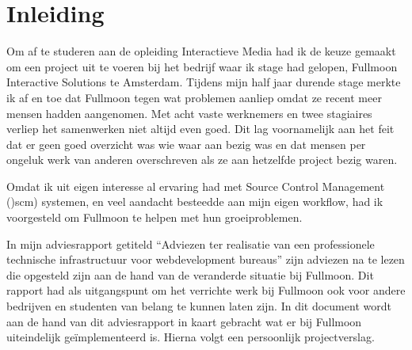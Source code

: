 \chapter{Inleiding}

Om af te studeren aan de opleiding Interactieve Media had ik de keuze gemaakt om een project uit te voeren bij het bedrijf waar ik stage had gelopen, Fullmoon Interactive Solutions te Amsterdam. Tijdens mijn half jaar durende stage merkte ik af en toe dat Fullmoon tegen wat problemen aanliep omdat ze recent meer mensen hadden aangenomen. Met acht vaste werknemers en twee stagiaires verliep het samenwerken niet altijd even goed. Dit lag voornamelijk aan het feit dat er geen goed overzicht was wie waar aan bezig was en dat mensen per ongeluk werk van anderen overschreven als ze aan hetzelfde project bezig waren.

Omdat ik uit eigen interesse al ervaring had met Source Control Management (){\sc scm}) systemen, en veel aandacht besteedde aan mijn eigen workflow, had ik voorgesteld om Fullmoon te helpen met hun groeiproblemen.

In mijn adviesrapport getiteld ``Adviezen ter realisatie van een professionele technische infrastructuur voor webdevelopment bureaus'' zijn adviezen na te lezen die opgesteld zijn aan de hand van de veranderde situatie bij Fullmoon. Dit rapport had als uitgangspunt om het verrichte werk bij Fullmoon ook voor andere bedrijven en studenten van belang te kunnen laten zijn. In dit document wordt aan de hand van dit adviesrapport in kaart gebracht wat er bij Fullmoon uiteindelijk geïmplementeerd is. Hierna volgt een persoonlijk projectverslag.
